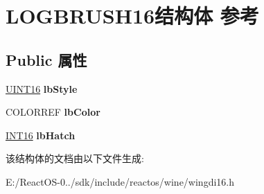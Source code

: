 \hypertarget{struct_l_o_g_b_r_u_s_h16}{}\section{L\+O\+G\+B\+R\+U\+S\+H16结构体 参考}
\label{struct_l_o_g_b_r_u_s_h16}
\subsection*{Public 属性}
\begin{DoxyCompactItemize}
\item 
\mbox{\label{struct_l_o_g_b_r_u_s_h16_a08dc6bafd25f4701fe422e1cdfdc64aa}} 
\hyperlink{_processor_bind_8h_a09f1a1fb2293e33483cc8d44aefb1eb1}{U\+I\+N\+T16} {\bfseries lb\+Style}
\item 
\mbox{\label{struct_l_o_g_b_r_u_s_h16_afaab74907975ee9a007c5b9dd2ad1f7c}} 
C\+O\+L\+O\+R\+R\+EF {\bfseries lb\+Color}
\item 
\mbox{\label{struct_l_o_g_b_r_u_s_h16_a1f61d0bf08b4744c0bd9f96a79f1a659}} 
\hyperlink{_processor_bind_8h_a30f500129d8c688af07726d5d34ce52d}{I\+N\+T16} {\bfseries lb\+Hatch}
\end{DoxyCompactItemize}


该结构体的文档由以下文件生成\+:\begin{DoxyCompactItemize}
\item 
E\+:/\+React\+O\+S-\/0../sdk/include/reactos/wine/wingdi16.\+h\end{DoxyCompactItemize}
